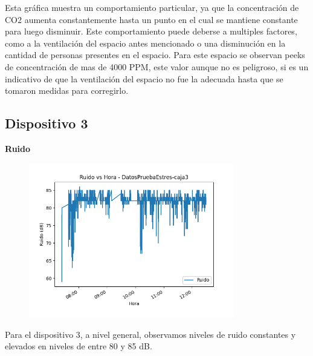 \documentclass{templateNote}
\begin{document}
\begin{tcolorbox}
    Esta gráfica muestra un comportamiento particular, ya que la concentración de CO2 aumenta constantemente hasta un punto en el cual se mantiene constante para luego disminuir. Este comportamiento puede deberse a multiples factores, como a la ventilación del espacio antes mencionado o una disminución en la cantidad de personas presentes en el espacio. Para este espacio se observan peeks de concentración de mas de 4000 PPM, este valor aunque no es peligroso, si es un indicativo de que la ventilación del espacio no fue la adecuada hasta que se tomaron medidas para corregirlo.
\end{tcolorbox}

\newpage
\subsection{Dispositivo 3}

\textbf{Ruido}
\begin{figure}[H]
    \centering
    \includegraphics[width=0.8\textwidth]{img/DatosPruebaEstres-caja3_ruido_vs_hora.png}
\end{figure}

\begin{tcolorbox}
    Para el dispositivo 3, a nivel general, observamos niveles de ruido constantes y elevados en niveles de entre 80 y 85 dB.
\end{tcolorbox}
\end{document}
